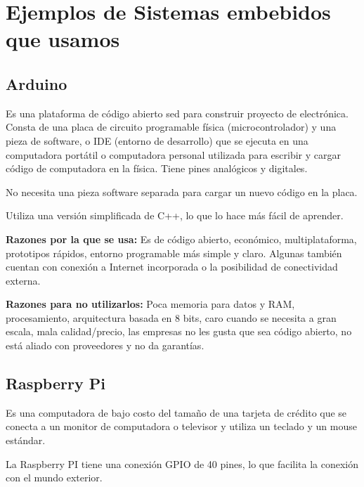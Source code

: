 \documentclass[12pt, twoside, openright]{report} %
\begin{document}
\section{Ejemplos de Sistemas embebidos que usamos}
\subsection{Arduino}

Es una plataforma de código abierto sed para construir proyecto de electrónica.	Consta de una placa de circuito programable física (microcontrolador) y una pieza de software, o IDE (entorno de desarrollo) que se ejecuta en una computadora portátil o computadora personal utilizada para escribir y cargar código de computadora en la física. Tiene pines analógicos y digitales.

No necesita una pieza software separada para cargar un nuevo código en la placa.

Utiliza una versión simplificada de C++, lo que lo hace más fácil de aprender.

\textbf{Razones por la que se usa:} Es de código abierto, económico, multiplataforma, prototipos rápidos, entorno programable más simple y claro. Algunas también cuentan con conexión a Internet incorporada o la posibilidad de conectividad externa.

\textbf{Razones para no utilizarlos:} Poca memoria para datos y RAM, procesamiento, arquitectura basada en 8 bits, caro cuando se necesita a gran escala, mala calidad/precio, las empresas no les gusta que sea código abierto, no está aliado con proveedores y no da garantías.

\subsection{Raspberry Pi}

Es una computadora de bajo costo del tamaño de una tarjeta de crédito que se conecta a un monitor de computadora o televisor y utiliza un teclado y un mouse estándar.

La Raspberry PI tiene una conexión GPIO de 40 pines, lo que facilita la conexión con el mundo exterior.
\end{document}
